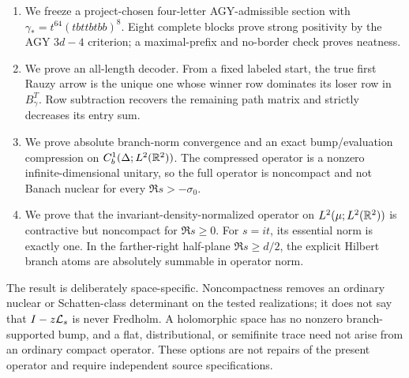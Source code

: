 \begin{enumerate}
\item We freeze a project-chosen four-letter AGY-admissible section with
\(\gamma_*=t^{64}(tbttbtbb)^8\).  Eight complete blocks prove strong
positivity by the AGY \(3d-4\) criterion; a maximal-prefix and no-border
check proves neatness.

\item We prove an all-length decoder.  From a fixed labeled start, the true
first Rauzy arrow is the unique one whose winner row dominates its loser row
in \(B_\gamma^T\).  Row subtraction recovers the remaining path matrix and
strictly decreases its entry sum.

\item We prove absolute branch-norm convergence and an exact
bump/evaluation compression on
\(C_b^1(\Delta;L^2(\mathbb R^2))\).  The compressed operator is a nonzero
infinite-dimensional unitary, so the full operator is noncompact and not
Banach nuclear for every \(\Re s>-\sigma _0\).

\item We prove that the invariant-density-normalized operator on
\(L^2(\mu;L^2(\mathbb R^2))\) is contractive but noncompact for \(\Re s\ge0\).
For \(s=it\), its essential norm is exactly one.  In the farther-right
half-plane \(\Re s\ge d/2\), the explicit Hilbert branch atoms are absolutely
summable in operator norm.
\end{enumerate}

The result is deliberately space-specific.  Noncompactness removes an
ordinary nuclear or Schatten-class determinant on the tested realizations;
it does not say that \(I-z\mathcal L_s\) is never Fredholm.  A holomorphic space has
no nonzero branch-supported bump, and a flat, distributional, or semifinite
trace need not arise from an ordinary compact operator.  These options are
not repairs of the present operator and require independent source
specifications.

